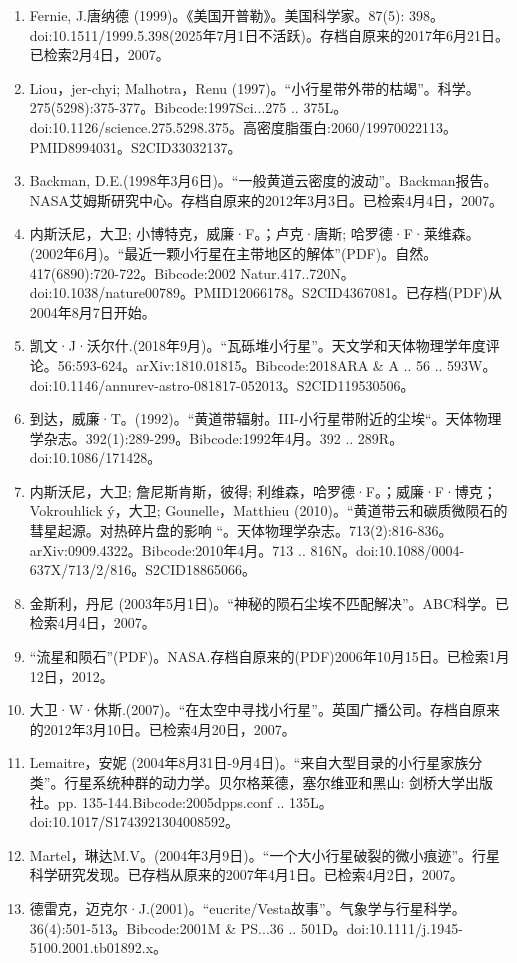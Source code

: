 \begin{enumerate}
\item Fernie, J.唐纳德 (1999)。《美国开普勒》。美国科学家。87(5): 398。doi:10.1511/1999.5.398(2025年7月1日不活跃)。存档自原来的2017年6月21日。已检索2月4日，2007。
\item Liou，jer-chyi; Malhotra，Renu (1997)。“小行星带外带的枯竭”。科学。275(5298):375-377。Bibcode:1997Sci...275 .. 375L。doi:10.1126/science.275.5298.375。高密度脂蛋白:2060/19970022113。PMID8994031。S2CID33032137。  
\item Backman, D.E.(1998年3月6日)。“一般黄道云密度的波动”。Backman报告。NASA艾姆斯研究中心。存档自原来的2012年3月3日。已检索4月4日，2007。
\item 内斯沃尼，大卫; 小博特克，威廉·F。；卢克·唐斯; 哈罗德·F·莱维森。(2002年6月)。“最近一颗小行星在主带地区的解体”(PDF)。自然。417(6890):720-722。Bibcode:2002 Natur.417..720N。doi:10.1038/nature00789。PMID12066178。S2CID4367081。已存档(PDF)从2004年8月7日开始。   
\item 凯文·J·沃尔什.(2018年9月)。“瓦砾堆小行星”。天文学和天体物理学年度评论。56:593-624。arXiv:1810.01815。Bibcode:2018ARA & A .. 56 .. 593W。doi:10.1146/annurev-astro-081817-052013。S2CID119530506。 
\item 到达，威廉·T。(1992)。“黄道带辐射。III-小行星带附近的尘埃“。天体物理学杂志。392(1):289-299。Bibcode:1992年4月。392 .. 289R。doi:10.1086/171428。
\item 内斯沃尼，大卫; 詹尼斯肯斯，彼得; 利维森，哈罗德·F。；威廉·F·博克；Vokrouhlick ý，大卫; Gounelle，Matthieu (2010)。“黄道带云和碳质微陨石的彗星起源。对热碎片盘的影响 “。天体物理学杂志。713(2):816-836。arXiv:0909.4322。Bibcode:2010年4月。713 .. 816N。doi:10.1088/0004-637X/713/2/816。S2CID18865066。 
\item 金斯利，丹尼 (2003年5月1日)。“神秘的陨石尘埃不匹配解决”。ABC科学。已检索4月4日，2007。
\item “流星和陨石”(PDF)。NASA.存档自原来的(PDF)2006年10月15日。已检索1月12日，2012。
\item 大卫·W·休斯.(2007)。“在太空中寻找小行星”。英国广播公司。存档自原来的2012年3月10日。已检索4月20日，2007。
\item Lemaitre，安妮 (2004年8月31日-9月4日)。“来自大型目录的小行星家族分类”。行星系统种群的动力学。贝尔格莱德，塞尔维亚和黑山: 剑桥大学出版社。pp. 135-144.Bibcode:2005dpps.conf .. 135L。doi:10.1017/S1743921304008592。
\item Martel，琳达M.V。(2004年3月9日)。“一个大小行星破裂的微小痕迹”。行星科学研究发现。已存档从原来的2007年4月1日。已检索4月2日，2007。
\item 德雷克，迈克尔·J.(2001)。“eucrite/Vesta故事”。气象学与行星科学。36(4):501-513。Bibcode:2001M & PS...36 .. 501D。doi:10.1111/j.1945-5100.2001.tb01892.x。

\end{enumerate}
